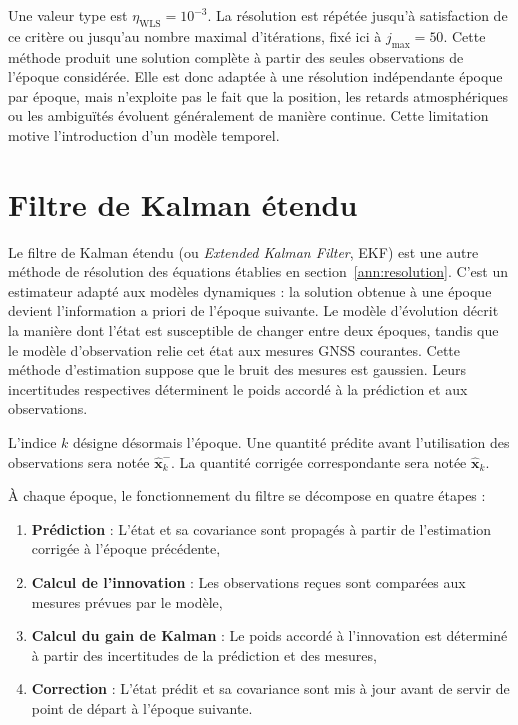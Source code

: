 Une valeur type est $\eta_{\mathrm{WLS}}=10^{-3}$. La résolution est répétée
jusqu'à satisfaction de ce critère ou jusqu'au nombre maximal d'itérations,
fixé ici à $j_{\max}=50$. Cette méthode produit une
solution complète à partir des seules observations de l'époque considérée.
Elle est donc adaptée à une résolution indépendante époque par époque, mais
n'exploite pas le fait que la position, les retards atmosphériques ou les
ambiguïtés évoluent généralement de manière continue. Cette limitation motive
l'introduction d'un modèle temporel.

\section{Filtre de Kalman étendu }
\label{ann:Kalman}

Le filtre de Kalman étendu (ou \emph{Extended Kalman Filter}, EKF) est une autre méthode de résolution des équations établies en section~\ref{ann:resolution}.
C'est un estimateur adapté aux modèles dynamiques : la solution
obtenue à une époque devient l'information a priori de l'époque suivante. Le modèle d'évolution décrit la manière
dont l'état est susceptible de changer entre deux époques, tandis que le modèle
d'observation relie cet état aux mesures GNSS courantes. Cette méthode d'estimation suppose que le bruit des mesures est gaussien. Leurs incertitudes
respectives déterminent le poids accordé à la prédiction et aux observations.

L'indice $k$ désigne désormais l'époque. Une quantité prédite avant
l'utilisation des observations sera notée
$\widehat{\mathbf x}_k^-$. La quantité corrigée correspondante sera notée $\widehat{\mathbf x}_k$.

À chaque époque, le fonctionnement du filtre se décompose en quatre étapes :

\begin{enumerate}
    \item \textbf{Prédiction} : L'état et sa covariance sont propagés à partir
    de l'estimation corrigée à l'époque précédente,
    \item \textbf{Calcul de l'innovation} : Les observations reçues sont
    comparées aux mesures prévues par le modèle,
    \item \textbf{Calcul du gain de Kalman} : Le poids accordé à l'innovation
    est déterminé à partir des incertitudes de la prédiction et des mesures,
    \item \textbf{Correction} : L'état prédit et sa covariance sont mis à jour
    avant de servir de point de départ à l'époque suivante.
\end{enumerate}

